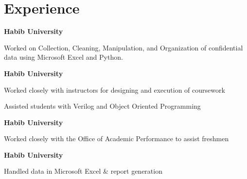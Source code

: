\documentclass[]{resume}
\begin{document}
\begin{minipage}[t]{0.59\textwidth} 
    
    
\section{Experience}

\thinspace \textbf{Habib University}

\vspace{\topsep} %
\begin{tightemize}
\sectionsep
\item Worked on Collection, Cleaning, Manipulation, and Organization of confidential data using Microsoft Excel and Python.
\end{tightemize}  


\thinspace \textbf{Habib University}

\begin{tightemize}
\sectionsep
\item Worked closely with instructors for designing and execution of coursework 
\item Assisted students with Verilog and Object Oriented Programming
\end{tightemize}


\thinspace \textbf{Habib University}

\begin{tightemize}
\sectionsep
\item Worked closely with the Office of Academic Performance to assist freshmen
\end{tightemize}


\thinspace \textbf{Habib University}

\begin{tightemize}
\sectionsep
\item Handled data in Microsoft Excel \& report generation
\end{tightemize}


\end{minipage}
\end{document}
